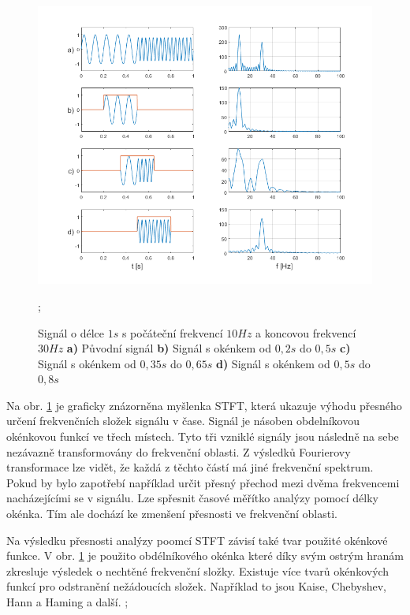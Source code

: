   \begin{figure}[H]
    \centering
    \includegraphics[width = 1\linewidth]{obrazky/STFT.png}
    \caption{Signál o délce $1 s$ s počáteční frekvencí $10 Hz$ a koncovou frekvencí $30 Hz$ \textbf{a)} Původní signál \textbf{b)} Signál s okénkem od $0,2 s$ do $0,5 s$ \textbf{c)} Signál s okénkem od $0,35 s$ do $0,65 s$ \textbf{d)} Signál s okénkem od $0,5 s$ do $0,8 s$};
    \label{fig:STFT}
  \end{figure}

  Na obr. \ref*{fig:STFT} je graficky znázorněna myšlenka \acs{STFT}, která ukazuje výhodu přesného určení frekvenčních složek signálu v čase. 
  Signál je násoben obdelníkovou okénkovou funkcí ve třech místech.
  Tyto tři vzniklé signály jsou následně na sebe nezávazně transformovány do frekvenční oblasti.
  Z výsledků Fourierovy transformace lze vidět, že každá z těchto částí má jiné frekvenční spektrum.
  Pokud by bylo zapotřebí například určit přesný přechod mezi dvěma frekvencemi nacházejícími se v signálu. Lze spřesnit časové měřítko analýzy pomocí délky okénka.
  Tím ale dochází ke zmenšení přesnosti ve frekvenční oblasti.
  
  Na výsledku přesnosti analýzy poomcí \acs{STFT} závisí také tvar použité okénkové funkce.
  V obr. \ref*{fig:STFT} je použito obdélníkového okénka které díky svým ostrým hranám zkresluje výsledek o nechtěné frekvenční složky.
  Existuje více tvarů okénkových funkcí pro odstranění nežádoucích složek.
  Například to jsou Kaise, Chebyshev, Hann a Haming a další.
  \cite{Time-frequency_distributions};

